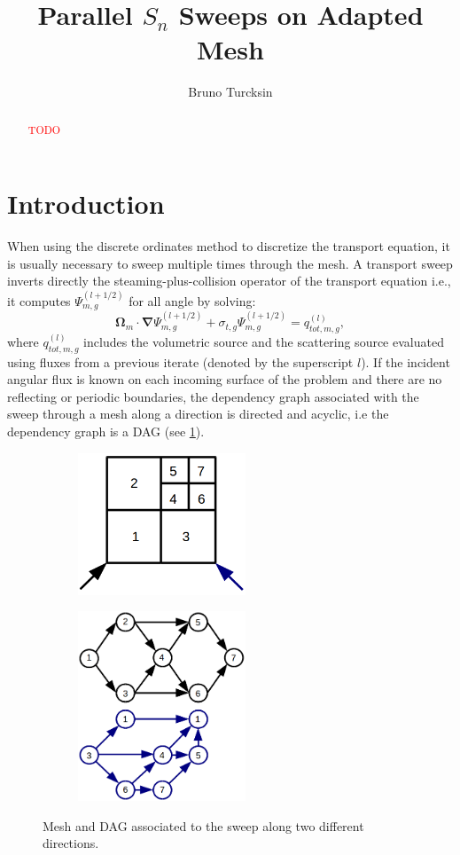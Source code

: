 \documentclass[letterpaper]{article}
\newcommand\bn{\boldsymbol{\nabla}}
\newcommand\bo{\boldsymbol{\Omega}}
\newcommand\red{\textcolor{red}}
\renewcommand{\(}{\left(}
\renewcommand{\)}{\right)}
\renewcommand{\[}{\left[}
\renewcommand{\]}{\right]}
\begin{document}
\title{Parallel $S_n$ Sweeps on Adapted Mesh}
\author{Bruno Turcksin} 
\date{}
\maketitle

\begin{abstract}
  \red{TODO}
\end{abstract}

\section{Introduction}
When using the discrete ordinates method to discretize the transport equation,
it is usually necessary to sweep multiple times through the mesh. A transport
sweep inverts directly the steaming-plus-collision operator of the transport
equation i.e., it computes $\Psi_{m,g}^{(l+1/2)}$ for all angle by solving:
\begin{equation}
  \bo_m\cdot\bn\Psi_{m,g}^{(l+1/2)}+\sigma_{t,g}\Psi_{m,g}^{(l+1/2)} =
  q_{tot,m,g}^{(l)},
\end{equation}
where $q_{tot,m,g}^{(l)}$ includes the volumetric source and the scattering
source evaluated using fluxes from a previous iterate (denoted by the
superscript $l$).
If the incident angular flux is known on each incoming surface of the
problem and there are no reflecting or periodic boundaries, the dependency graph 
associated with the sweep through a mesh
along a direction is directed and acyclic, i.e the
dependency graph is a DAG (see \cref{tasks}).
\begin{figure}[H]
  \begin{subfigure}[c]{.5\textwidth}
    \centering
    \includegraphics[width=5cm]{task_1}
  \end{subfigure}
  \begin{subfigure}[c]{.5\textwidth}
    \centering
    \includegraphics[width=5cm]{task_2}
  \end{subfigure}
  \caption{Mesh and DAG associated to the sweep along two different directions.}
  \label{tasks}
\end{figure}
\end{document}

